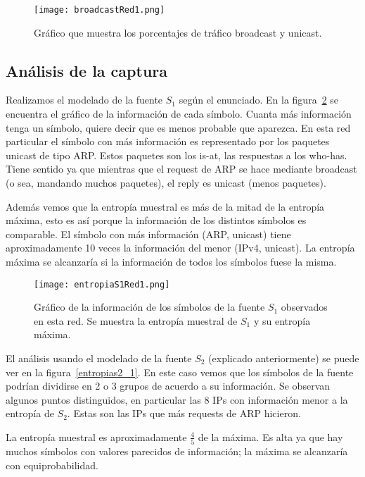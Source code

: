 
\begin{figure}[H]
\centering
\texttt{[image: broadcastRed1.png]}
\caption{Gráfico que muestra los porcentajes de tráfico broadcast y unicast.}
\label{broadcast1}
\end{figure}

\subsection{Análisis de la captura}

Realizamos el modelado de la fuente $S_1$ según el enunciado. En la figura~\ref{entropias1_1} se encuentra el gráfico de la información de cada símbolo. Cuanta más información tenga un símbolo, quiere decir que es menos probable que aparezca. En esta red particular el símbolo con más información es representado por los paquetes unicast de tipo ARP. Estos paquetes son los is-at, las respuestas a los who-has. Tiene sentido ya que mientras que el request de ARP se hace mediante broadcast (o sea, mandando muchos paquetes), el reply es unicast (menos paquetes).

Además vemos que la entropía muestral es más de la mitad de la entropía máxima, esto es así porque la información de los distintos símbolos es comparable. El símbolo con más información (ARP, unicast) tiene aproximadamente 10 veces la información del menor (IPv4, unicast). La entropía máxima se alcanzaría si la información de todos los símbolos fuese la misma.

\begin{figure}[H]
\centering
\texttt{[image: entropiaS1Red1.png]}
\caption{Gráfico de la información de los símbolos de la fuente $S_1$ observados en esta red. Se muestra la entropía muestral de $S_1$ y su entropía máxima.}
\label{entropias1_1}
\end{figure}

El análisis usando el modelado de la fuente $S_2$ (explicado anteriormente) se puede ver en la figura~\ref{entropias2_1}. En este caso vemos que los símbolos de la fuente podrían dividirse en 2 o 3 grupos de acuerdo a su información. Se observan algunos puntos distinguidos, en particular las 8 IPs con información menor a la entropía de $S_2$. Estas son las IPs que más requests de ARP hicieron. 

La entropía muestral es aproximadamente $\frac{4}{5}$ de la máxima. Es alta ya que hay muchos símbolos con valores parecidos de información; la máxima se alcanzaría con equiprobabilidad.


